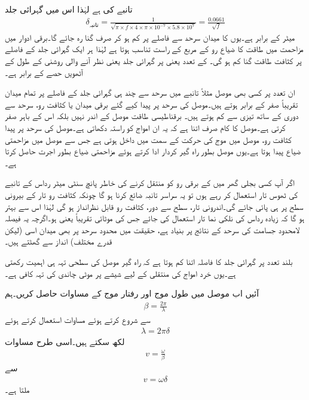 تانبے کی  ہے لہٰذا اس میں گہرائی جلد
\begin{align*}
\delta_{\text{تانبہ}}=\frac{1}{\sqrt{\pi \times f  \times 4 \times \pi \times 10^{-7} \times 5.8 \times 10^{7}}}=\frac{0.0661}{\sqrt{f}}
\end{align*}
میٹر کے برابر ہے۔یوں  کا میدان سرحد سے  فاصلے پر کم ہو کر صرف  گنا رہ جائے گا۔برقی ادوار میں مزاحمت میں طاقت کا ضیاع رو کے مربع کے راست تناسب ہوتا ہے لہٰذا ہر ایک گہرائی جلد کے فاصلے پر کثافت طاقت  گنا کم ہو گی۔ کے تعدد یعنی  پر گہرائی جلد  یعنی نظر آنے والی روشنی کے طول کے آٹھویں حصے  کے برابر ہے۔

ان تعدد پر کسی بھی موصل مثلاً تانبے میں سرحد سے چند ہی گہرائی جلد کے فاصلے پر تمام میدان تقریباً صفر کے برابر ہوتے ہیں۔موصل کی سرحد پر پیدا کیے گئے برقی میدان یا کثافت رو، سرحد سے دوری کے ساتھ تیزی سے کم ہوتے ہیں۔ برقناطیسی طاقت موصل کے اندر نہیں بلکہ اس کے باہر صفر کرتی ہے۔موصل کا کام صرف اتنا ہے کہ یہ ان امواج کو راستہ دکھاتی ہے۔موصل کی سرحد پر پیدا کثافت رو، موصل میں موج کی حرکت کے  سمت میں داخل ہوتی ہے جس سے موصل میں مزاحمتی ضیاع پیدا ہوتا ہے۔یوں موصل بطور راہ گیر  کردار ادا کرتے ہوئے مزاحمتی ضیاع بطور اجرت حاصل کرتا ہے۔  

اگر آپ کسی بجلی گھر میں   کے برقی رو کو منتقل کرنے کی خاطر پانچ سنٹی میٹر رداس کے تانبے کی ٹھوس تار استعمال کر رہے ہوں تو یہ سراسر تانبہ ضائع کرنا ہو گا چونکہ کثافت رو تار کے بیرونی سطح پر ہی پائی جائے گی۔اندرونی تار، سطح سے دور، کثافت رو قابل نظرانداز ہو گی لہٰذا اس سے بہتر ہو گا کہ زیادہ رداس کی نلکی نما تار استعمال کی جائے جس کی موٹائی تقریباً  یعنی  ہو۔اگرچہ یہ فیصلہ لامحدود جسامت کی سرحد کے نتائج پر بنیاد ہے، حقیقت میں محدود سرحد پر بھی میدان اسی   (لیکن قدرے مختلف) انداز سے گھٹتے ہیں۔

بلند تعدد پر گہرائی جلد کا فاصلہ اتنا کم ہوتا ہے کہ راہ گیر موصل کی سطحی تہہ ہی اہمیت رکھتی ہے۔یوں خرد امواج کی منتقلی کے لیے شیشے پر  موٹی چاندی کی تہہ کافی ہے۔

آئیں اب موصل میں طول موج اور رفتار موج کے مساوات حاصل کریں۔ہم
\begin{align*}
\beta=\frac{2\pi}{\lambda}
\end{align*}
سے شروع کرتے ہوئے مساوات  استعمال کرتے ہوئے
\begin{align*}
\lambda=2\pi\delta
\end{align*}
لکھ سکتے ہیں۔اسی طرح مساوات 
\begin{align*}
v=\frac{\omega}{\beta}
\end{align*}
سے
\begin{align}
v=\omega \delta
\end{align}
ملتا ہے۔

